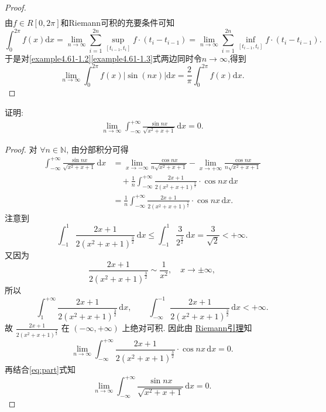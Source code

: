 \documentclass[../../main.tex]{subfiles}%
\begin{document}
\begin{proof}
\begin{align}
\end{align}
由\(f\in R[0, 2\pi]\)和Riemann可积的充要条件可知
\[
\int_0^{2\pi}{f(x)\mathrm{d}x}=\lim_{n\rightarrow \infty}\sum_{i = 1}^{2n}{\sup_{[t_{i - 1}, t_i]}f\cdot(t_i - t_{i - 1})}=\lim_{n\rightarrow \infty}\sum_{i = 1}^{2n}{\inf_{[t_{i - 1}, t_i]}f\cdot(t_i - t_{i - 1})}.
\]
于是对\eqref{example4.61-1.2}\eqref{example4.61-1.3}式两边同时令\(n\rightarrow \infty\),得到
\[
\lim_{n\rightarrow \infty}\int_0^{2\pi}{f(x)|\sin(nx)|\mathrm{d}x}=\frac{2}{\pi}\int_0^{2\pi}{f(x)\mathrm{d}x}.
\]
\end{proof}

\begin{example}
证明:
\begin{align*}
\lim_{n\to\infty} \int_{-\infty}^{+\infty} \frac{\sin nx}{\sqrt{x^2+x+1}} \, \mathrm{d}x = 0.
\end{align*}
\end{example}
\begin{proof}

对 $\forall n\in \mathbb{N}$, 由分部积分可得
\begin{align}
\int_{-\infty}^{+\infty} \frac{\sin nx}{\sqrt{x^2+x+1}} \, \mathrm{d}x 
&= \lim_{x\to -\infty} \frac{\cos nx}{n\sqrt{x^2+x+1}} - \lim_{x\to +\infty} \frac{\cos nx}{n\sqrt{x^2+x+1}} \nonumber \\
&\quad + \frac{1}{n} \int_{-\infty}^{+\infty} \frac{2x+1}{2(x^2+x+1)^{\frac{3}{2}}} \cdot \cos nx \, \mathrm{d}x \nonumber \\
&= \frac{1}{n} \int_{-\infty}^{+\infty} \frac{2x+1}{2(x^2+x+1)^{\frac{3}{2}}} \cdot \cos nx \, \mathrm{d}x. \label{eq:part}
\end{align}
注意到
\[
\int_{-1}^1 \frac{2x+1}{2(x^2+x+1)^{\frac{3}{2}}} \, \mathrm{d}x \leqslant \int_{-1}^1 \frac{3}{2^{\frac{3}{2}}} \, \mathrm{d}x = \frac{3}{\sqrt{2}} < +\infty.
\]
又因为
\[
\frac{2x+1}{2(x^2+x+1)^{\frac{3}{2}}} \sim \frac{1}{x^2}, \quad x\to \pm\infty,
\]
所以
\[
\int_1^{+\infty} \frac{2x+1}{2(x^2+x+1)^{\frac{3}{2}}} \, \mathrm{d}x, \qquad \int_{-\infty}^{-1} \frac{2x+1}{2(x^2+x+1)^{\frac{3}{2}}} \, \mathrm{d}x < +\infty.
\]
故 $\frac{2x+1}{2(x^2+x+1)^{\frac{3}{2}}}$ 在 $(-\infty,+\infty)$ 上绝对可积. 因此由 \hyperref[theorem:Riemann引理]{Riemann引理}知
\[
\lim_{n\to\infty} \int_{-\infty}^{+\infty} \frac{2x+1}{2(x^2+x+1)^{\frac{3}{2}}} \cdot \cos nx \, \mathrm{d}x = 0.
\]
再结合\eqref{eq:part}式知
\[
\lim_{n\to\infty} \int_{-\infty}^{+\infty} \frac{\sin nx}{\sqrt{x^2+x+1}} \, \mathrm{d}x = 0.
\]
\end{proof}
\end{document}
